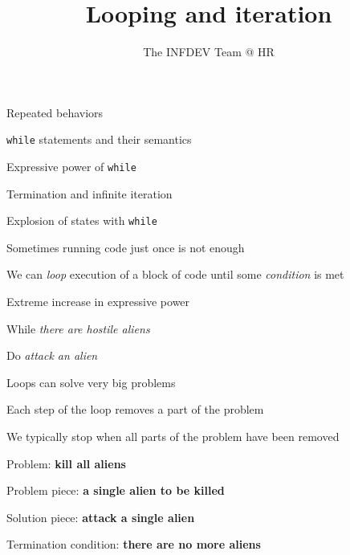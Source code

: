 \documentclass{beamer}
\title{Looping and iteration}
\author{The INFDEV Team @ HR}
\institute{Hogeschool Rotterdam \\ 
Rotterdam, Netherlands}
\date{}
\begin{document}
\maketitle

\begin{slide}{
\item Repeated behaviors
\item \texttt{while} statements and their semantics
\item Expressive power of \texttt{while}
\item Termination and infinite iteration
\item Explosion of states with \texttt{while}
}\end{slide}


\begin{slide}{
\item Sometimes running code just once is not enough
\item We can \textit{loop} execution of a block of code until some \textit{condition} is met
\item Extreme increase in expressive power
}\end{slide}

\begin{slide}{
\item While \textit{there are hostile aliens}
\item Do \textit{attack an alien}
}\end{slide}

\begin{slide}{
\item Loops can solve very big problems
\item Each step of the loop removes a part of the problem
\item We typically stop when all parts of the problem have been removed
}\end{slide}

\begin{slide}{
\item Problem: \textbf{kill all aliens}
\item Problem piece: \textbf{a single alien to be killed}
\item Solution piece: \textbf{attack a single alien}
\item Termination condition: \textbf{there are no more aliens}
}\end{slide}
\end{document}
